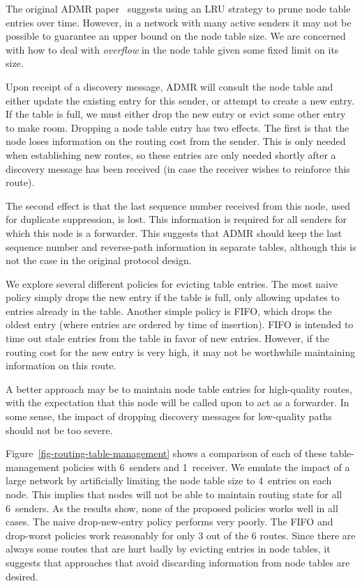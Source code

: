 The original ADMR paper~\cite{admr} suggests using an LRU
strategy to prune node table entries over time. However, 
in a network with many active senders it may not be possible
to guarantee an upper bound on the node table size. 
We are concerned with how to deal with {\em overflow} in the node 
table given some fixed limit on its size. 

Upon receipt of a discovery message, ADMR will consult the node 
table and either update the existing entry for this sender, or
attempt to create a new entry. If the table is full, we must either
drop the new entry or evict some other entry to make room.
Dropping a node table entry has two effects. The first is that the node
loses information on the routing cost from the sender. This is
only needed when establishing new routes, so these entries
are only needed shortly after a discovery message has been
received (in case the receiver wishes to reinforce this route).

The second effect is that the last sequence number received
from this node, used for duplicate suppression, is lost. 
This information is required for all senders for which this
node is a forwarder. This suggests that ADMR should keep
the last sequence number and reverse-path information in 
separate tables, although this is not the case in the
original protocol design.

We explore several different policies for evicting table entries.
The most naive policy simply drops the new entry if the table is full,
only allowing updates to entries already in the table. 
Another simple policy is FIFO, which drops the oldest entry 
(where entries are ordered by time of insertion). FIFO is intended to 
time out stale entries from the table in favor of new entries. However,
if the routing cost for the new entry is very high, it may not
be worthwhile maintaining information on this route. 

A better approach may be to maintain node table entries for 
high-quality routes, with the expectation that this node will
be called upon to act as a forwarder. In some sense, the impact
of dropping discovery messages for low-quality paths should not
be too severe. 

Figure~\ref{fig-routing-table-management} shows a comparison 
of each of these table-management policies with 6~senders and
1~receiver. We emulate the impact of a large network by artificially
limiting the node table size to 4~entries on each node. 
This implies that nodes will not be able to maintain routing state for 
all 6~senders. As the results show, none of the proposed 
policies works well in all cases. The naive drop-new-entry
policy performs very poorly. The FIFO and drop-worst policies 
work reasonably for only 3 out of the 6 routes. Since there are always some
routes that are hurt badly by evicting entries in node tables, it suggests
that approaches that avoid discarding information from node tables are
desired.

